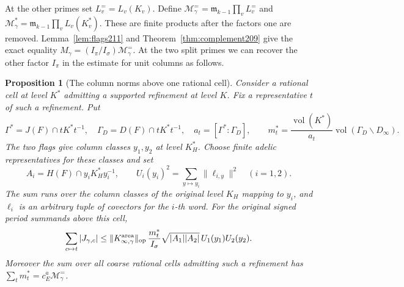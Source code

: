 \documentclass[a4paper,11pt]{article}
\newtheorem{proposition}{Proposition}[section]
\theoremstyle{definition}
\theoremstyle{remark}
\numberwithin{equation}{section}
\begin{document}
At the other primes set \(L_v^{=}=L_v(K_v)\). Define
\(\mathcal M_\gamma^{=}=\mathfrak m_{k-1}\prod_v L_v^{=}\) and
\(\mathcal M_\gamma^*=\mathfrak m_{k-1}\prod_v L_v(K^*_v)\).
These are finite products after the factors one are removed.
Lemma~\ref{lem:flags211} and Theorem~\ref{thm:complement209}
give the exact equality \(M_\gamma=(I_\pi/I_\sigma)\mathcal
M_\gamma^{=}\). At the two split primes we can recover the other
factor \(I_\pi\) in the estimate for unit columns as follows.

\begin{proposition}[The column norms above one rational cell]
\label{prop:fibres211}
Consider a rational cell at level \(K^*\) admitting a supported
refinement at level \(K\). Fix a representative \(t\) of such a
refinement. Put
\[
 \Gamma^*=J(F)\cap tK^*t^{-1},\quad
 \Gamma_D=D(F)\cap tK^*t^{-1},\quad a_t=[\Gamma^*:\Gamma_D],
 \qquad
 m_t^*=\frac{\operatorname{vol}(K^*)}{a_t}
               \operatorname{vol}(\Gamma_D\backslash D_\infty).
\]
The two flags give column classes \(y_1,y_2\) at level \(K_H^*\).
Choose finite adelic representatives for these classes and set
\[
 A_i=H(F)\cap y_i K_H^* y_i^{-1},\qquad
 U_i(y_i)^2=\sum_{y\mapsto y_i}\|\ell_{i,y}\|^2\quad(i=1,2).
\]
The sum runs over the column classes of the original level
\(K_H\) mapping to \(y_i\), and \(\ell_i\) is an arbitrary
tuple of covectors for the \(i\)-th word. For the original signed
period summands above this cell,
\begin{equation}
 \sum_{c\mapsto t}|J_{\gamma,c}|
 \le \|K_{\infty,\gamma}^{\rm area}\|_{\rm op}\,
       \frac{m_t^*}{I_\sigma}
       \sqrt{|A_1||A_2|}\,U_1(y_1)U_2(y_2).
 \label{eq:fibres211}
\end{equation}
Moreover the sum over all coarse rational cells admitting such
a refinement has \(\sum_t m_t^*=c_E^a\mathcal M_\gamma^{=}\).
\end{proposition}
\end{document}
